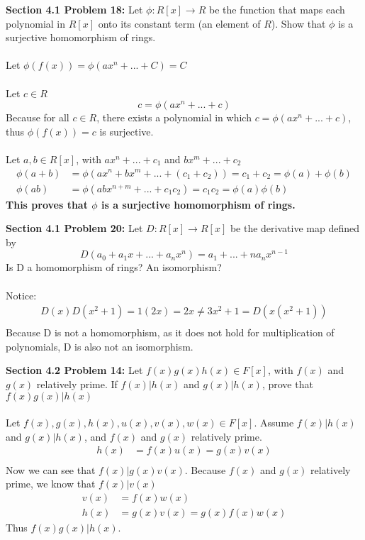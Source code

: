 \documentclass[12pt]{article}
\begin{document}
\noindent \textbf{Section 4.1 Problem 18: }Let $\phi:R[x] \rightarrow R$ be the function that maps each polynomial in $R[x]$ onto its constant term (an element of $R$). Show that $\phi$ is a surjective homomorphism of rings. 
\\ \\
Let $\phi(f(x)) = \phi(ax^n + ... + C) = C $
\\ \\
Let $c \in R$
	$$
	c = \phi(ax^n + ... + c)
	$$
Because for all $c \in R$, there exists a  polynomial in which $c = \phi(ax^n + ... + c)$, thus $\phi(f(x)) = c$ is surjective.
\\ \\
Let $a,b \in R[x]$, with $ax^n + ... + c_1$ and $bx^m + ... + c_2$
	\begin{align*}
		\phi(a + b) &= \phi(ax^n + bx^m + ... + (c_1 + c_2)) = c_1 + c_2 = \phi(a) + \phi(b) \\
		\phi(ab) &= \phi(abx^{n+m} + ... + c_1c_2) = c_1c_2 = \phi(a)\phi(b)
	\end{align*}
\textbf{\boldmath This proves that $\phi$ is a surjective homomorphism of rings.} 

\newpage 

\noindent \textbf{Section 4.1 Problem 20: }Let $D:R[x] \rightarrow R[x]$ be the derivative map defined by 
	$$
	D(a_0 + a_1x + ... + a_nx^n) = a_1 + ... + na_nx^{n-1}
	$$
Is D a homomorphism of rings? An isomorphism? 
\\ \\
Notice: 
	\begin{align*}
		D(x)D(x^2 + 1) = 1(2x) = 2x \not = 3x^2 + 1 = D(x(x^2 + 1)) \\
	\end{align*}
Because D is not a homomorphism, as it does not hold for multiplication of polynomials, D is also not an isomorphism.

\newpage 

\noindent \textbf{Section 4.2 Problem 14: }Let $f(x)g(x)h(x) \in F[x]$, with $f(x)$ and $g(x)$ relatively prime. If $f(x)|h(x)$ and $g(x)|h(x)$, prove that $f(x)g(x)|h(x)$
\\ \\
Let $f(x),g(x),h(x),u(x),v(x),w(x) \in F[x]$. Assume $f(x)|h(x)$ and $g(x)|h(x)$, and $f(x)$ and $g(x)$ relatively prime.
	\begin{align*}
		h(x) &= f(x)u(x) = g(x)v(x) \\
	\end{align*}
Now we can see that $f(x)|g(x)v(x)$. Because $f(x)$ and $g(x)$ relatively prime, we know that $f(x)|v(x)$
	\begin{align*}
		v(x) &= f(x)w(x) \\
		h(x) &= g(x)v(x) = g(x)f(x)w(x) 
	\end{align*}
Thus $f(x)g(x)|h(x)$.
	
\end{document}
